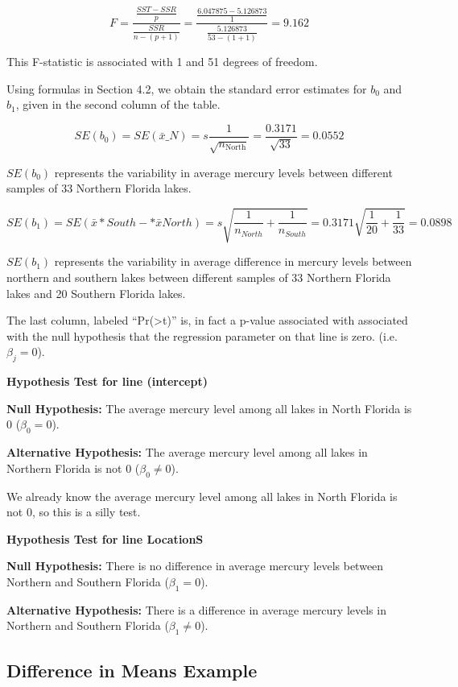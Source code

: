 \documentclass[
  letterpaper,
  DIV=11,
  numbers=noendperiod]{scrreprt}
\begin{document}
\[ F=\frac{\frac{SST - SSR}{p}}{\frac{SSR}{n-(p+1)}} = \frac{\frac{6.047875 - 5.126873}{1}}{\frac{5.126873}{53-(1+1)}} = 9.162 \]

This F-statistic is associated with 1 and 51 degrees of freedom.

Using formulas in Section 4.2, we obtain the standard error estimates
for \(b_0\) and \(b_1\), given in the second column of the table.

\[SE(b_0) = SE(\bar{x}\_N)=s\frac{1}{\sqrt{n_{\text{North}}}} = \frac{0.3171}{\sqrt{33}} =0.0552 \]

\(SE(b_0)\) represents the variability in average mercury levels between
different samples of 33 Northern Florida lakes.

\[
SE(b_1) = SE(\bar{x}*{South}-*\bar{x}{North})=s\sqrt{\frac{1}{n_{North}}+\frac{1}{n_{South}}} = 0.3171\sqrt{\frac{1}{20} + \frac{1}{33}} =0.0898
\]

\(SE(b_1)\) represents the variability in average difference in mercury
levels between northern and southern lakes between different samples of
33 Northern Florida lakes and 20 Southern Florida lakes.

The last column, labeled ``Pr(\textgreater\textbar t\textbar)'' is, in
fact a p-value associated with associated with the null hypothesis that
the regression parameter on that line is zero. (i.e.~\(\beta_j=0\)).

\textbf{Hypothesis Test for line (intercept)}

\textbf{Null Hypothesis:} The average mercury level among all lakes in
North Florida is 0 (\(\beta_0=0\)).

\textbf{Alternative Hypothesis:} The average mercury level among all
lakes in Northern Florida is not 0 (\(\beta_0\neq 0\)).

We already know the average mercury level among all lakes in North
Florida is not 0, so this is a silly test.

\textbf{Hypothesis Test for line LocationS}

\textbf{Null Hypothesis:} There is no difference in average mercury
levels between Northern and Southern Florida (\(\beta_1=0\)).

\textbf{Alternative Hypothesis:} There is a difference in average
mercury levels in Northern and Southern Florida (\(\beta_1\neq 0\)).

\subsection{Difference in Means
Example}\label{difference-in-means-example}
\end{document}
